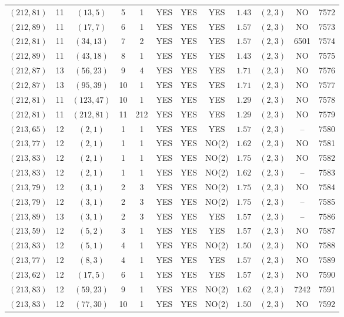 \begin{longtable}{|c|c|c|c|c|c|c|c|c|c|c|c|}
$(212,81)$ & 11 & $(13,5)$ & 5 & 1 & YES & YES & YES & $1.43$ & $(2,3)$ & NO & 7572\\
$(212,89)$ & 11 & $(17,7)$ & 6 & 1 & YES & YES & YES & $1.57$ & $(2,3)$ & NO & 7573\\
$(212,81)$ & 11 & $(34,13)$ & 7 & 2 & YES & YES & YES & $1.57$ & $(2,3)$ & 6501 & 7574\\
$(212,89)$ & 11 & $(43,18)$ & 8 & 1 & YES & YES & YES & $1.43$ & $(2,3)$ & NO & 7575\\
$(212,87)$ & 13 & $(56,23)$ & 9 & 4 & YES & YES & YES & $1.71$ & $(2,3)$ & NO & 7576\\
$(212,87)$ & 13 & $(95,39)$ & 10 & 1 & YES & YES & YES & $1.71$ & $(2,3)$ & NO & 7577\\
$(212,81)$ & 11 & $(123,47)$ & 10 & 1 & YES & YES & YES & $1.29$ & $(2,3)$ & NO & 7578\\
$(212,81)$ & 11 & $(212,81)$ & 11 & 212 & YES & YES & YES & $1.29$ & $(2,3)$ & NO & 7579\\
$(213,65)$ & 12 & $(2,1)$ & 1 & 1 & YES & YES & YES & $1.57$ & $(2,3)$ & -- & 7580\\
$(213,77)$ & 12 & $(2,1)$ & 1 & 1 & YES & YES & NO(2) & $1.62$ & $(2,3)$ & NO & 7581\\
$(213,83)$ & 12 & $(2,1)$ & 1 & 1 & YES & YES & NO(2) & $1.75$ & $(2,3)$ & NO & 7582\\
$(213,83)$ & 12 & $(2,1)$ & 1 & 1 & YES & YES & NO(2) & $1.62$ & $(2,3)$ & -- & 7583\\
$(213,79)$ & 12 & $(3,1)$ & 2 & 3 & YES & YES & NO(2) & $1.75$ & $(2,3)$ & NO & 7584\\
$(213,79)$ & 12 & $(3,1)$ & 2 & 3 & YES & YES & NO(2) & $1.75$ & $(2,3)$ & -- & 7585\\
$(213,89)$ & 13 & $(3,1)$ & 2 & 3 & YES & YES & YES & $1.57$ & $(2,3)$ & -- & 7586\\
$(213,59)$ & 12 & $(5,2)$ & 3 & 1 & YES & YES & YES & $1.57$ & $(2,3)$ & NO & 7587\\
$(213,83)$ & 12 & $(5,1)$ & 4 & 1 & YES & YES & NO(2) & $1.50$ & $(2,3)$ & NO & 7588\\
$(213,77)$ & 12 & $(8,3)$ & 4 & 1 & YES & YES & YES & $1.57$ & $(2,3)$ & NO & 7589\\
$(213,62)$ & 12 & $(17,5)$ & 6 & 1 & YES & YES & YES & $1.57$ & $(2,3)$ & NO & 7590\\
$(213,83)$ & 12 & $(59,23)$ & 9 & 1 & YES & YES & NO(2) & $1.62$ & $(2,3)$ & 7242 & 7591\\
$(213,83)$ & 12 & $(77,30)$ & 10 & 1 & YES & YES & NO(2) & $1.50$ & $(2,3)$ & NO & 7592\\

\end{longtable}
